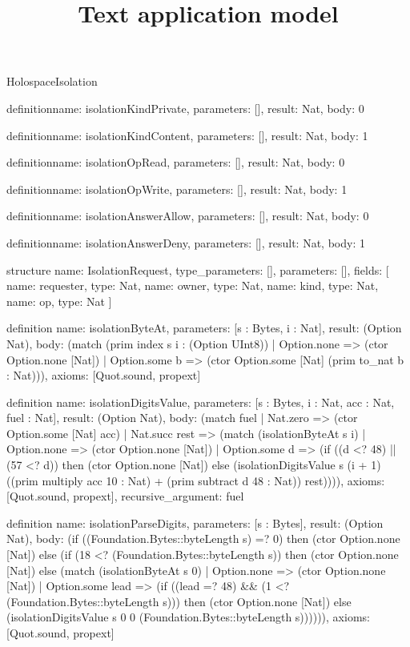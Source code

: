 \begin{lexlean}{HolospaceIsolation}
\title{Text application model}
\begin{semanticmodule}
definition{name: isolationKindPrivate, parameters: [], result: Nat, body: 0}

definition{name: isolationKindContent, parameters: [], result: Nat, body: 1}

definition{name: isolationOpRead, parameters: [], result: Nat, body: 0}

definition{name: isolationOpWrite, parameters: [], result: Nat, body: 1}

definition{name: isolationAnswerAllow, parameters: [], result: Nat, body: 0}

definition{name: isolationAnswerDeny, parameters: [], result: Nat, body: 1}

structure{
  name: IsolationRequest,
  type_parameters: [],
  parameters: [],
  fields: [
    {name: requester, type: Nat},
    {name: owner, type: Nat},
    {name: kind, type: Nat},
    {name: op, type: Nat}
  ]
}

definition{
  name: isolationByteAt,
  parameters: [s : Bytes, i : Nat],
  result: (Option Nat),
  body: (match (prim index s i : (Option UInt8))
    | Option.none => (ctor Option.none [Nat])
    | Option.some b => (ctor Option.some [Nat] (prim to_nat b : Nat))),
  axioms: [Quot.sound, propext]
}

definition{
  name: isolationDigitsValue,
  parameters: [s : Bytes, i : Nat, acc : Nat, fuel : Nat],
  result: (Option Nat),
  body: (match fuel
    | Nat.zero => (ctor Option.some [Nat] acc)
    | Nat.succ rest => (match (isolationByteAt s i)
      | Option.none => (ctor Option.none [Nat])
      | Option.some d => (if ((d <? 48) || (57 <? d)) then (ctor Option.none [Nat]) else (isolationDigitsValue s (i + 1) ((prim multiply acc 10 : Nat) + (prim subtract d 48 : Nat)) rest)))),
  axioms: [Quot.sound, propext],
  recursive_argument: fuel
}

definition{
  name: isolationParseDigits,
  parameters: [s : Bytes],
  result: (Option Nat),
  body: (if ((Foundation.Bytes::byteLength s) =? 0) then (ctor Option.none [Nat]) else (if (18 <? (Foundation.Bytes::byteLength s)) then (ctor Option.none [Nat]) else (match (isolationByteAt s 0)
    | Option.none => (ctor Option.none [Nat])
    | Option.some lead => (if ((lead =? 48) && (1 <? (Foundation.Bytes::byteLength s))) then (ctor Option.none [Nat]) else (isolationDigitsValue s 0 0 (Foundation.Bytes::byteLength s)))))),
  axioms: [Quot.sound, propext]
}


\end{semanticmodule}
\end{lexlean}
